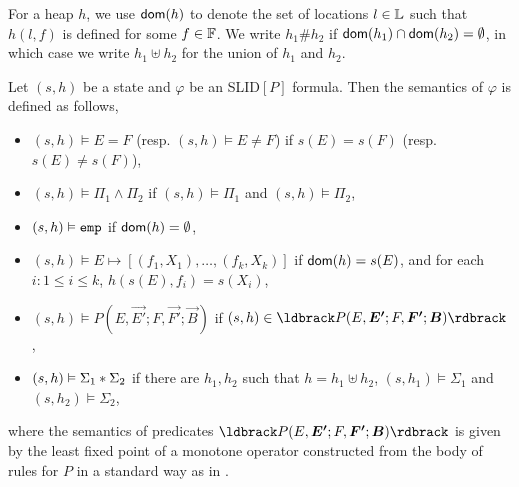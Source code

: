 \documentclass{llncs}
\newcommand{\zhilin}[1]{\color{red} {ZL: #1 :LZ} \color{black}}
\newcommand{\tl}[1]{\color{blue} {TL: #1 :LT} \color{black}}
\begin{document}
For a heap $h$, we use ${\sf dom}(h)$ to denote the set of locations $l \in {\mathbb L}$ such that  $h(l,f)$ is defined for some $f \in \mathbb{F}$.
%
%
We write $h_1 \# h_2$ if ${\sf dom}(h_1) \cap {\sf dom}(h_2)=\emptyset$, in which case we write $h_1 \uplus h_2$ for the union of $h_1$ and $h_2$.
%

Let $(s,h)$ be a state and $\varphi$ be an SLID$[P]$ formula. Then the semantics of $\varphi$ is defined as follows,
\begin{itemize}
\item $(s,h) \vDash E = F$ (resp. $(s,h) \vDash E \neq F$) if $s(E)=s(F)$ (resp. $s(E) \neq s(F)$),

%
%
\item $(s,h) \vDash \Pi_1 \wedge \Pi_2$ if $(s,h) \vDash \Pi_1$ and $(s,h) \vDash \Pi_2$,
%

\item $(s,h) \vDash \mathtt{emp}$ if ${\sf dom}(h)=\emptyset$,

%
\item $(s,h) \vDash E \mapsto [(f_1,X_1),\dots,(f_k, X_k)]$ if ${\sf dom}(h)=s(E)$, and for each $i: 1 \le i \le k$, $h(s(E), f_i)=s(X_i)$,
%
%
\item $(s,h) \vDash P(E,\vec{E'}; F, \vec{F'}; \vec{B})$ if $(s,h) \in \ldbrack P(E,\vec{E'}; F, \vec{F'}; \vec{B}) \rdbrack$,
%
\item $(s,h) \vDash \Sigma_1 \ast \Sigma_2$ if there are $h_1,h_2$ such that $h= h_1 \uplus h_2$, $(s,h_1) \vDash \Sigma_1$ and $(s,h_2) \vDash \Sigma_2$,
\end{itemize}
\vspace{-2mm}
where the semantics of predicates $\ldbrack P(E,\vec{E'}; F, \vec{F'}; \vec{B}) \rdbrack$ is given by the least fixed point of a monotone operator constructed from the body of rules for $P$ in a standard way as in \cite{BFP+14}.  %
\end{document}
